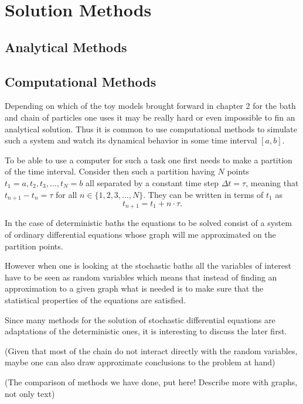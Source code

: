 
\chapter{Solution Methods}

\section{Analytical Methods}

\section{Computational Methods}

Depending on which of the toy models brought forward in chapter 2 for the bath and chain of particles one uses it may be really hard or even impossible to fin an analytical solution. Thus it is common to use computational methods to simulate such a system and watch its dynamical behavior in some time interval $ [a,b] $.

To be able to use a computer for such a task one first needs to make a partition of the time interval. Consider then such a partition having $ N $ points $ t_1=a, t_2, t_3, \dots, t_N=b $ all separated by a constant time step $ \Delta t = \tau $, meaning that $ t_{n+1} - t_{n} = \tau $ for all $ n\in \{1,2,3,\dots,N\} $. They can be written in terms of $ t_{1} $ as
$$ t_{n+1} = t_{1} + n\cdot \tau. $$

In the case of deterministic baths the equations to be solved consist of a system of ordinary differential equations whose graph will me approximated on the partition points.

However when one is looking at the stochastic baths all the variables of interest have to be seen as random variables which means that instead of finding an approximation to a given graph what is needed is to make sure that the statistical properties of the equations are satisfied.

Since many methods for the solution of stochastic differential equations are adaptations of the deterministic ones, it is interesting to discuss the later first.

(Given that most of the chain do not interact directly with the random variables, maybe one can also draw approximate conclusions to the problem at hand)


(The comparison of methods we have done, put here! Describe more with graphs, not only text)


